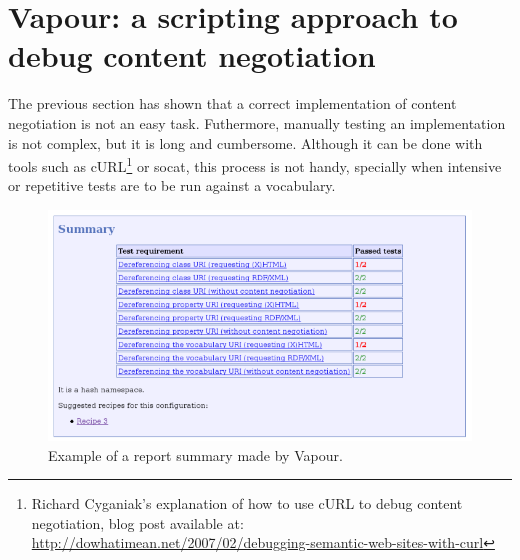 \documentclass{../templates/llncs}
\begin{document}


\section{\label{sec:vapour}Vapour: a scripting approach to debug content negotiation}

The previous section has shown that a correct implementation of content negotiation 
is not an easy task. Futhermore, manually testing an implementation is not complex, but
it is long and cumbersome. Although it can be done with tools such as 
cURL\footnote{Richard Cyganiak's explanation of how to use cURL to debug content negotiation, 
blog post available at: \url{http://dowhatimean.net/2007/02/debugging-semantic-web-sites-with-curl}}
or socat, this process is not handy, specially when intensive or repetitive tests are
to be run against a vocabulary.

\begin{figure}
 \centering
 \includegraphics[width=12cm]{images/report-summary.png}
 \caption{\label{fig:report-summary}Example of a report summary made by Vapour.}
\end{figure}
\end{document}
